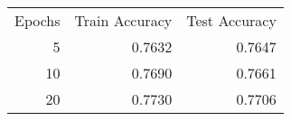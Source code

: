 \begin{tabular}{rrr}
Epochs & Train Accuracy & Test Accuracy \\
5 & 0.7632 & 0.7647 \\
10 & 0.7690 & 0.7661 \\
20 & 0.7730 & 0.7706 \\
\end{tabular}

